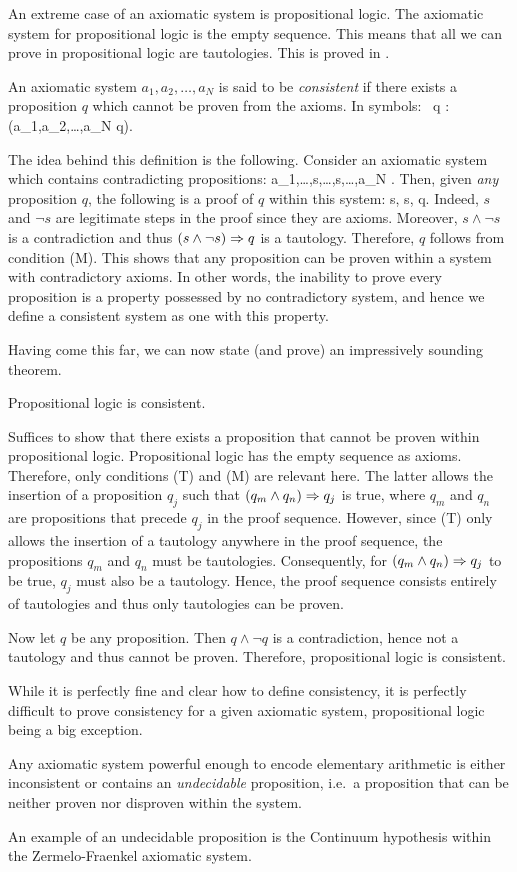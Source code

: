 An extreme case of an axiomatic system is propositional logic. The axiomatic
system for propositional logic is the empty sequence. This means that all we
can prove in propositional logic are tautologies. This is proved in
.

\bd
An axiomatic system $a_1,a_2,\ldots,a_N$ is said to be
\emph{consistent} if there exists a proposition $q$ which
cannot be proven from the axioms. In symbols:
\bse
\exists \, q : \neg (a_1,a_2,\ldots,a_N \vdash q).
\ese
\ed

The idea behind this definition is the following. Consider an axiomatic system
which contains contradicting propositions:
\bse
a_1,\ldots,s,\ldots,\neg s,\ldots,a_N .
\ese
Then, given \emph{any} proposition $q$, the following is a proof of $q$ within
this system:
\bse
s, \neg s, q.
\ese
Indeed, $s$ and $\neg s$ are legitimate steps in the proof since they are
axioms. Moreover, $s\land \neg s$ is a contradiction and thus $(s\land \neg s)
\Rightarrow q$ is a tautology. Therefore, $q$ follows from condition (M). This shows
that any proposition can be proven within a system with contradictory axioms.
In other words, the inability to prove every proposition is a property
possessed by no contradictory system, and hence we define a consistent system
as one with this property.

Having come this far, we can now state (and prove) an impressively sounding
theorem.

\bt
Propositional logic is consistent. \label{thm:prop_logic_is_consitent}
\et

\bq
Suffices to show that there exists a proposition that cannot be proven within
propositional logic. Propositional logic has the empty sequence as axioms.
Therefore, only conditions (T) and (M) are relevant here. The latter allows
the insertion of a proposition $q_j$ such that $(q_m\land q_n) \Rightarrow q_j$ is
true, where $q_m$ and $q_n$ are propositions that precede $q_j$ in the proof
sequence. However, since (T) only allows the insertion of a tautology anywhere
in the proof sequence, the propositions $q_m$ and $q_n$ must be tautologies.
Consequently, for $(q_m\land q_n) \Rightarrow q_j$ to be true, $q_j$ must also be a
tautology. Hence, the proof sequence consists entirely of tautologies and thus
only tautologies can be proven.

Now let $q$ be any proposition. Then $q\land \neg q$ is a contradiction, hence
not a tautology and thus cannot be proven. Therefore, propositional logic is
consistent.
\eq

\br
While it is perfectly fine and clear how to define consistency, it is
perfectly difficult to prove consistency for a given axiomatic system,
propositional logic being a big exception.
\er

\bt
Any axiomatic system powerful enough to encode elementary arithmetic is either
inconsistent or contains an \emph{undecidable} proposition,
i.e.\ a proposition that can be neither proven nor disproven within the
system.
\et

An example of an undecidable proposition is the Continuum hypothesis within
the Zermelo-Fraenkel axiomatic system.  
